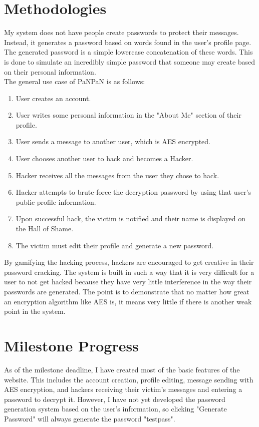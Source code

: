 \documentclass[conference]{csce}
\begin{document}
\section{Methodologies}
My system does not have people create passwords to protect their messages. Instead, it generates a password based on words found in the user's profile page. The generated password is a simple lowercase concatenation of these words. This is done to simulate an incredibly simple password that someone may create based on their personal information.
\\ \indent The general use case of PaNPaN is as follows: \\
\begin{enumerate}
    \item User creates an account.
    \item User writes some personal information in the "About Me" section of their profile.
    \item User sends a message to another user, which is AES encrypted.
    \item User chooses another user to hack and becomes a Hacker.
    \item Hacker receives all the messages from the user they chose to hack.
    \item Hacker attempts to brute-force the decryption password by using that user's public profile information.
    \item Upon successful hack, the victim is notified and their name is displayed on the Hall of Shame.
    \item The victim must edit their profile and generate a new password.
\end{enumerate}
\indent By gamifying the hacking process, hackers are encouraged to get creative in their password cracking. The system is built in such a way that it is very difficult for a user to not get hacked because they have very little interference in the way their passwords are generated. The point is to demonstrate that no matter how great an encryption algorithm like AES is, it means very little if there is another weak point in the system.
\section{Milestone Progress}
As of the milestone deadline, I have created most of the basic features of the website. This includes the account creation, profile editing, message sending with AES encryption, and hackers receiving their victim's messages and entering a password to decrypt it. However, I have not yet developed the password generation system based on the user's information, so clicking "Generate Password" will always generate the password "testpass".
\end{document}
